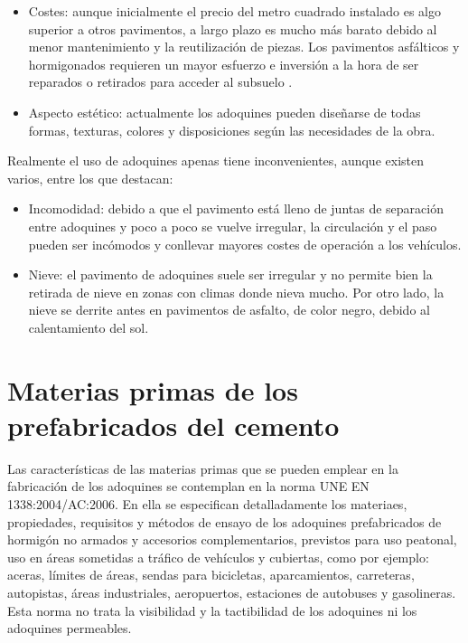 \begin{itemize}
\item Costes: aunque inicialmente el precio del metro cuadrado instalado es algo superior a otros pavimentos, a largo plazo es mucho más barato debido al menor mantenimiento y la reutilización de piezas. Los pavimentos asfálticos y hormigonados requieren un mayor esfuerzo e inversión a la hora de ser reparados o retirados para acceder al subsuelo \cite{pavimentos,euroadoquin}.

\item Aspecto estético: actualmente los adoquines pueden diseñarse de todas formas, texturas, colores y disposiciones según las necesidades de la obra.
\end{itemize}


Realmente el uso de adoquines apenas tiene inconvenientes, aunque existen varios, entre los que destacan:

\begin{itemize}
  \item Incomodidad: debido a que el pavimento está lleno de juntas de separación entre adoquines y poco a poco se vuelve irregular, la circulación y el paso pueden ser incómodos y conllevar mayores costes de operación a los vehículos.
  \item Nieve: el pavimento de adoquines suele ser irregular y no permite bien la retirada de nieve en zonas con climas donde nieva mucho. Por otro lado, la nieve se derrite antes en pavimentos de asfalto, de color negro, debido al calentamiento del sol.
\end{itemize}

\section{Materias primas de los prefabricados del cemento}
Las características de las materias primas que se pueden emplear en la fabricación de los adoquines se contemplan en la norma UNE EN 1338:2004/AC:2006. En ella se especifican detalladamente los materiaes, propiedades, requisitos y métodos de ensayo de los adoquines prefabricados de hormigón no armados y accesorios complementarios, previstos para uso peatonal, uso en áreas sometidas a tráfico de vehículos y cubiertas, como por ejemplo: aceras, límites de áreas, sendas para bicicletas, aparcamientos, carreteras, autopistas, áreas industriales, aeropuertos, estaciones de autobuses y gasolineras. Esta norma no trata la visibilidad y la tactibilidad de los adoquines ni los adoquines permeables.

